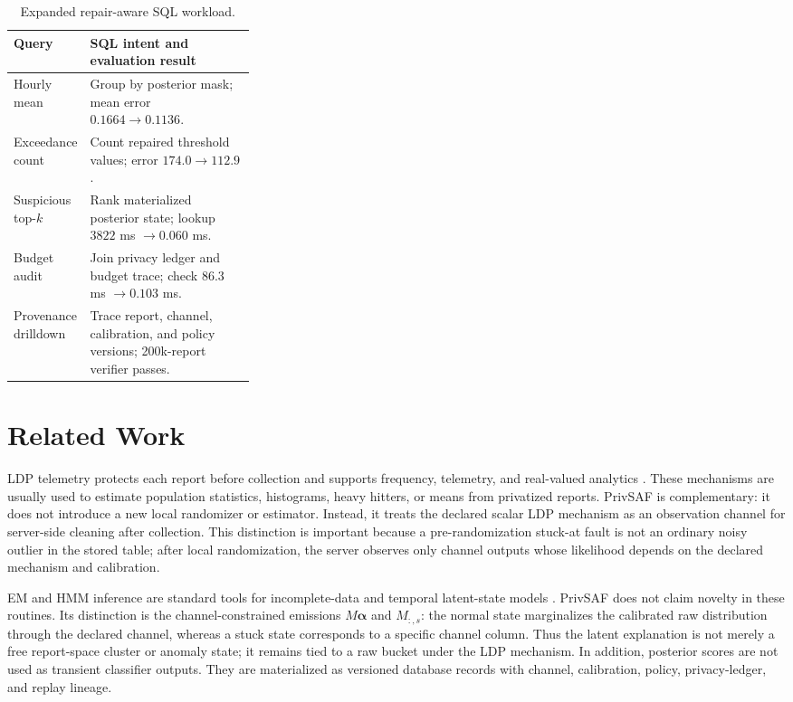 \documentclass[conference]{IEEEtran}
\begin{document}
\begin{table}[t]
\centering
\caption{Expanded repair-aware SQL workload.}
\label{tab:sql_workload}
\scriptsize
\setlength{\tabcolsep}{2pt}
\renewcommand{\arraystretch}{0.9}
\begin{tabularx}{\columnwidth}{p{0.31\linewidth}Y}
\toprule
Query & SQL intent and evaluation result \\
\midrule
Hourly mean & Group by posterior mask; mean error \(0.1664\rightarrow0.1136\). \\
Exceedance count & Count repaired threshold values; error \(174.0\rightarrow112.9\). \\
Suspicious top-\(k\) & Rank materialized posterior state; lookup \(3822\) ms \(\rightarrow0.060\) ms. \\
Budget audit & Join privacy ledger and budget trace; check \(86.3\) ms \(\rightarrow0.103\) ms. \\
Provenance drilldown & Trace report, channel, calibration, and policy versions; 200k-report verifier passes. \\
\bottomrule
\end{tabularx}
\end{table}

\section{Related Work}
\label{sec:related}

LDP telemetry protects each report before collection and supports frequency,
telemetry, and real-valued analytics
\cite{kasiviswanathan2011what,dworkroth2014,duchi2013localprivacy,
erlingsson2014rappor,nguyen2016harmony,ding2017telemetry,
wang2019multidimensional}. These mechanisms are usually used to estimate
population statistics, histograms, heavy hitters, or means from privatized
reports. PrivSAF is complementary: it does not introduce a new local
randomizer or estimator. Instead, it treats the declared scalar LDP mechanism
as an observation channel for server-side cleaning after collection. This
distinction is important because a pre-randomization stuck-at fault is not an
ordinary noisy outlier in the stored table; after local randomization, the
server observes only channel outputs whose likelihood depends on the declared
mechanism and calibration.

EM and HMM inference are standard tools for incomplete-data and temporal
latent-state models \cite{dempster1977em,rabiner1989hmm}. PrivSAF does not
claim novelty in these routines. Its distinction is the channel-constrained
emissions \(M\boldsymbol{\alpha}\) and \(M_{:,s}\): the normal state marginalizes
the calibrated raw distribution through the declared channel, whereas a stuck
state corresponds to a specific channel column. Thus the latent explanation is
not merely a free report-space cluster or anomaly state; it remains tied to a
raw bucket under the LDP mechanism. In addition, posterior scores are not used
as transient classifier outputs. They are materialized as versioned database
records with channel, calibration, policy, privacy-ledger, and replay lineage.
\end{document}
